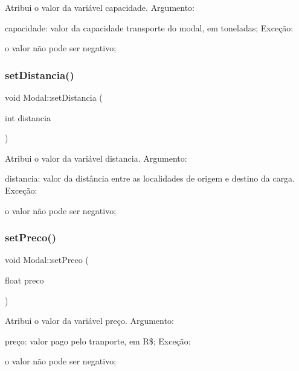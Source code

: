 Atribui o valor da variável capacidade. Argumento\+:
\begin{DoxyItemize}
\item capacidade\+: valor da capacidade transporte do modal, em toneladas; Exceção\+:
\begin{DoxyItemize}
\item o valor não pode ser negativo;
\end{DoxyItemize}
\end{DoxyItemize}\mbox{\label{classModal_adae73e94a5d76a2a97329cba1fe7fb20}} 
\subsubsection{\texorpdfstring{set\+Distancia()}{setDistancia()}}
{\footnotesize\ttfamily void Modal\+::set\+Distancia (\begin{DoxyParamCaption}\item[{int}]{distancia }\end{DoxyParamCaption})}

Atribui o valor da variável distancia. Argumento\+:
\begin{DoxyItemize}
\item distancia\+: valor da distância entre as localidades de origem e destino da carga. Exceção\+:
\begin{DoxyItemize}
\item o valor não pode ser negativo;
\end{DoxyItemize}
\end{DoxyItemize}\mbox{\label{classModal_ade6a106d1c7a0bc095ea1a012891ed00}} 
\subsubsection{\texorpdfstring{set\+Preco()}{setPreco()}}
{\footnotesize\ttfamily void Modal\+::set\+Preco (\begin{DoxyParamCaption}\item[{float}]{preco }\end{DoxyParamCaption})}

Atribui o valor da variável preço. Argumento\+:
\begin{DoxyItemize}
\item preço\+: valor pago pelo tranporte, em R\$; Exceção\+:
\begin{DoxyItemize}
\item o valor não pode ser negativo;
\end{DoxyItemize}
\end{DoxyItemize}\mbox{\label{classModal_ac8da271cfb67468b89cbca0b3951b9f7}} 
